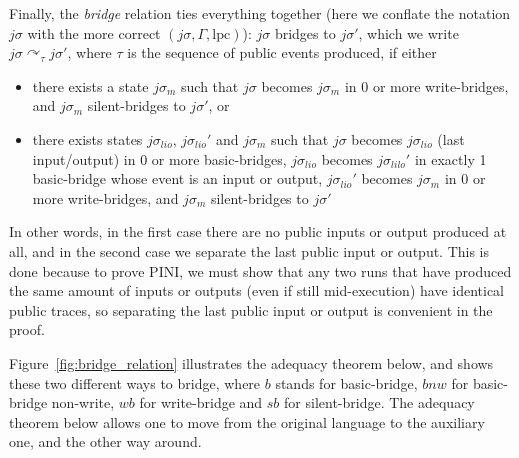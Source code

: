 \documentclass[10pt]{article}
\newcommand{\lpc}{\mathrm{lpc}}
\newcommand{\ctx}{\Gamma}
\newcommand{\bridge}[3] { #1 \curvearrowright_{#2} #3 }
\begin{document}
Finally, the \emph{bridge} relation ties everything together (here we conflate the notation \( j\sigma \) with the more correct \( (j\sigma, \ctx, \lpc) \)): \( j\sigma \) bridges to \( j\sigma' \), which we write \( \bridge{j\sigma}{\tau}{j\sigma'} \), where \( \tau \) is the sequence of public events produced, if either \begin{itemize}
\item there exists a state \( j\sigma_m \) such that \( j\sigma \) becomes \( j\sigma_m \) in 0 or more write-bridges, and \( j\sigma_m \) silent-bridges to \( j\sigma' \), or
\item there exists states \( j\sigma_{lio} \), \( j\sigma_{lio}' \) and \( j\sigma_m \) such that \( j\sigma \) becomes \( j\sigma_{lio} \) (last input/output) in 0 or more basic-bridges, \( j\sigma_{lio} \) becomes \( j\sigma_{lilo}' \) in exactly 1 basic-bridge whose event is an input or output, \( j\sigma_{lio}' \) becomes \( j\sigma_m \) in 0 or more write-bridges, and \( j\sigma_m \) silent-bridges to \(j\sigma' \) 
\end{itemize}
In other words, in the first case there are no public inputs or output produced at all, and in the second case we separate the last public input or output. This is done because to prove PINI, we must show that any two runs that have produced the same amount of inputs or outputs (even if still mid-execution) have identical public traces, so separating the last public input or output is convenient in the proof. 



Figure~\ref{fig:bridge_relation} illustrates the adequacy theorem below, and shows these two different ways to bridge, where $b$ stands for
basic-bridge, $bnw$ for basic-bridge non-write, $wb$ for write-bridge and $sb$ for silent-bridge.
The adequacy theorem below allows one to move from the original language to the auxiliary one, and the other way around.
\end{document}
